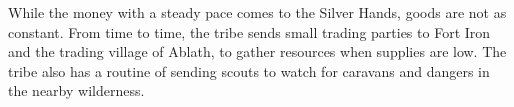 While the money with a steady pace comes to the Silver Hands, goods are not as constant. From time to time, the tribe sends small trading parties to Fort Iron and the trading village of Ablath, to gather resources when supplies are low. The tribe also has a routine of sending scouts to watch for caravans and dangers in the nearby wilderness.
